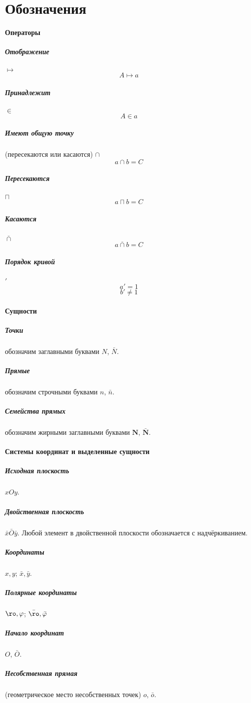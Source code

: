 
\section{Обозначения}
\paragraph{Операторы}
\subparagraph{Отображение} $\mapsto$
$$A\mapsto a$$
\subparagraph{Принадлежит} $\in$
$$A \in a$$
\subparagraph{Имеют общую точку} (пересекаются или касаются) $\cap$
$$a \cap b = C$$
\subparagraph{Пересекаются} $\sqcap$
$$a \sqcap b = C$$
\subparagraph{Касаются} $\overline\cap$
$$a \overline\cap b = C$$
\subparagraph{Порядок кривой} $'$ 
$$a' = 1$$
$$b' \ne 1$$

\paragraph{Сущности}
\subparagraph{Точки} обозначим заглавными буквами $N$, $\bar{N}$.
\subparagraph{Прямые} обозначим строчными буквами $n$, $\bar{n}$.
\subparagraph{Семейства прямых} обозначим жирными заглавными буквами $\mathbf{N}$, $\mathbf{\bar{N}}$.

\paragraph{Системы координат и выделенные сущности}
\subparagraph{Исходная плоскость} $xOy$.
\subparagraph{Двойственная плоскость} $\bar{x}\bar{O}\bar{y}$. Любой элемент в двойственной плоскости обозначается с надчёркиванием.
\subparagraph{Координаты} $x, y$; $\bar{x}, \bar{y}$.
\subparagraph{Полярные координаты} $\ro, \varphi$; $\bar\ro, \bar\varphi$
\subparagraph{Начало координат} $O$, $\bar{O}$.
\subparagraph{Несобственная прямая} (геометрическое место несобственных точек) $o$, $\bar{o}$.

